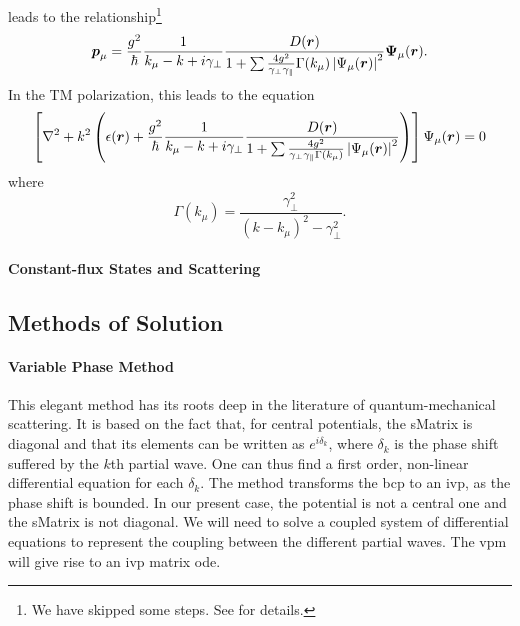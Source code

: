 leads to the relationship\footnote{We have skipped some steps. See \cite[\S2.2]{GE2010b} for details.}
  \begin{equation}
   \boldsymbol{p}_\mu = \frac{g^2}{\hbar}\frac{1}{k_\mu-k+i\gamma_\perp}\frac{D(\boldsymbol{r})}{1+\sum\frac{4g^2}{\gamma_\perp\gamma_\parallel}\Gamma(k_\mu)\left|\Psi_\mu(\boldsymbol{r})\right|^2}\boldsymbol{\Psi}_\mu(\boldsymbol{r}).
  \end{equation}
In the TM polarization, this leads to the equation
  \begin{equation}
   \left[\nabla^2+k^2\left(\epsilon(\boldsymbol{r})+\frac{g^2}{\hbar}\frac{1}{k_\mu-k+i\gamma_\perp}\frac{D(\boldsymbol{r})}{1+\sum\frac{4g^2}{\gamma_\perp\gamma_\parallel\Gamma(k_\mu)}\left|\Psi_\mu(\boldsymbol{r})\right|^2}\right)\right]\Psi_\mu(\boldsymbol{r})=0
  \end{equation}
where
	\begin{equation}
		\Gamma(k_\mu) = \frac{\gamma_\perp^2}{(k-k_\mu)^2-\gamma_\perp^2}.
	\end{equation}

\paragraph{Constant-flux States and Scattering}


\subsection{Methods of Solution}
\paragraph{Variable Phase Method}
This elegant method has its roots deep in the literature of quantum-mechanical
scattering. It is based on the fact that, for central potentials, the 
\gls{sMatrix} is diagonal and that its elements can be written as
$e^{i\delta_k}$, where $\delta_k$ is the phase shift suffered by the 
$k$th partial wave. One can thus find a first order, non-linear differential
equation \cite{CAL1967} for each $\delta_k$. The method transforms the \gls{bcp} to an \gls{ivp}, as the phase shift
is bounded. In our present case, the potential is not a central one and the
\gls{sMatrix} is not diagonal. We will need to solve a coupled system 
of differential equations to represent the coupling between the different
partial waves. The \gls{vpm} will give rise to an \gls{ivp} matrix \gls{ode}.


